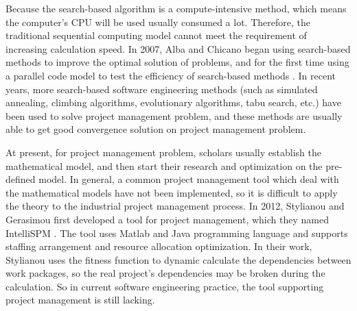 Because the search-based algorithm is a compute-intensive method, which means 
the computer's CPU will be used usually consumed a lot. Therefore, the 
traditional sequential computing model cannot meet the requirement of 
increasing calculation speed. In 2007, Alba and Chicano began using search-based
 methods to improve the optimal solution of problems, and for 
the first time using a parallel code model to test the efficiency of search-based 
methods \cite{pospichal}. In recent years, more search-based software 
engineering methods (such as simulated annealing, climbing algorithms, 
evolutionary algorithms, tabu search, etc.) have been used to solve project 
management problem, and these methods are usually able to get good 
convergence solution on project management problem.


At present, for project management problem, scholars usually establish the
mathematical model, and then start their research and optimization on the
pre-defined model. In general, a common project management tool which deal with
the mathematical models have not been implemented, so it is difficult to apply
the theory to the industrial project management process. In 2012, Stylianou and
Gerasimou first developed a tool for project management, which they named
IntelliSPM \cite{stylianou}. The tool uses Matlab and Java programming language and 
supports staffing arrangement and resource allocation optimization. In
their work, Stylianou uses the fitness function to dynamic calculate the
dependencies between work packages, so the real project's dependencies may be
broken during the calculation. So in current software engineering practice, the
tool supporting project management is still lacking.




